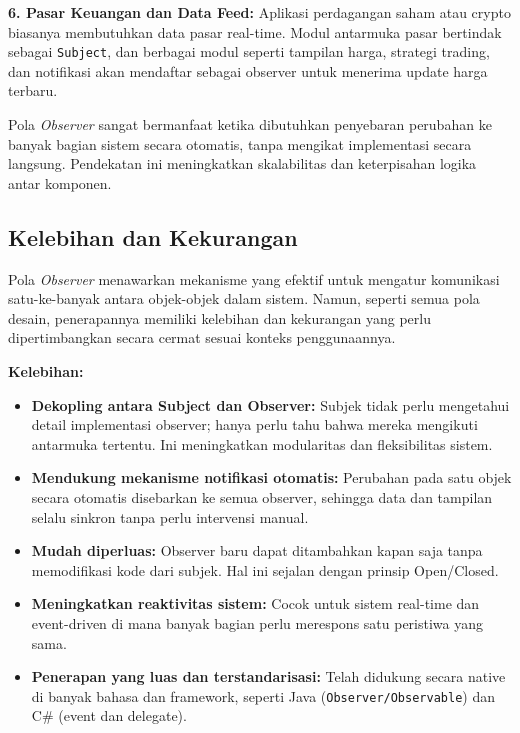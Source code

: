 \textbf{6. Pasar Keuangan dan Data Feed:}  
Aplikasi perdagangan saham atau crypto biasanya membutuhkan data pasar real-time. Modul antarmuka pasar bertindak sebagai \texttt{Subject}, dan berbagai modul seperti tampilan harga, strategi trading, dan notifikasi akan mendaftar sebagai observer untuk menerima update harga terbaru.

Pola \textit{Observer} sangat bermanfaat ketika dibutuhkan penyebaran perubahan ke banyak bagian sistem secara otomatis, tanpa mengikat implementasi secara langsung. Pendekatan ini meningkatkan skalabilitas dan keterpisahan logika antar komponen.

\subsection{Kelebihan dan Kekurangan}

Pola \textit{Observer} menawarkan mekanisme yang efektif untuk mengatur komunikasi satu-ke-banyak antara objek-objek dalam sistem. Namun, seperti semua pola desain, penerapannya memiliki kelebihan dan kekurangan yang perlu dipertimbangkan secara cermat sesuai konteks penggunaannya.

\textbf{Kelebihan:}
\begin{itemize}
	\item \textbf{Dekopling antara Subject dan Observer:} Subjek tidak perlu mengetahui detail implementasi observer; hanya perlu tahu bahwa mereka mengikuti antarmuka tertentu. Ini meningkatkan modularitas dan fleksibilitas sistem.
	
	\item \textbf{Mendukung mekanisme notifikasi otomatis:} Perubahan pada satu objek secara otomatis disebarkan ke semua observer, sehingga data dan tampilan selalu sinkron tanpa perlu intervensi manual.
	
	\item \textbf{Mudah diperluas:} Observer baru dapat ditambahkan kapan saja tanpa memodifikasi kode dari subjek. Hal ini sejalan dengan prinsip Open/Closed.
	
	\item \textbf{Meningkatkan reaktivitas sistem:} Cocok untuk sistem real-time dan event-driven di mana banyak bagian perlu merespons satu peristiwa yang sama.
	
	\item \textbf{Penerapan yang luas dan terstandarisasi:} Telah didukung secara native di banyak bahasa dan framework, seperti Java (\texttt{Observer/Observable}) dan C\# (event dan delegate).
\end{itemize}

